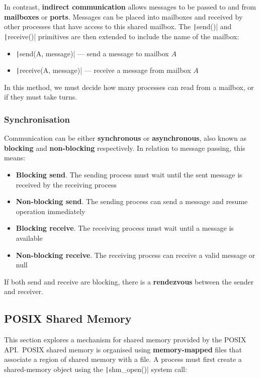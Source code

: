 \documentclass{article}
\begin{document}
In contrast, \textbf{indirect communication} allows messages to be
passed to and from \textbf{mailboxes} or \textbf{ports}. Messages can
be placed into mailboxes and received by other processes that have
access to this shared mailbox. The \texttt|send()| and
\texttt|receive()| primitives are then extended to include
the name of the mailbox:
\begin{itemize}
    \item \texttt|send(A, message)| --- send a message to
          mailbox \(A\)
    \item \texttt|receive(A, message)| --- receive a message
          from mailbox \(A\)
\end{itemize}
In this method, we must decide how many processes can read from a
mailbox, or if they must take turns.
\subsubsection{Synchronisation}
Communication can be either \textbf{synchronous} or
\textbf{asynchronous}, also known as \textbf{blocking} and
\textbf{non-blocking} respectively. In relation to message passing,
this means:
\begin{itemize}
    \item \textbf{Blocking send}. The sending process must wait until
          the sent message is received by the receiving process
    \item \textbf{Non-blocking send}. The sending process can send a
          message and resume operation immediately
    \item \textbf{Blocking receive}. The receiving process must wait
          until a message is available
    \item \textbf{Non-blocking receive}. The receiving process can
          receive a valid message or null
\end{itemize}
If both send and receive are blocking, there is a \textbf{rendezvous}
between the sender and receiver.
\subsection{POSIX Shared Memory}
This section explores a mechanism for shared memory provided by the
POSIX API.\ POSIX shared memory is organised using
\textbf{memory-mapped} files that associate a region of shared memory
with a file. A process must first create a shared-memory object using
the \texttt|shm_open()| system call:
\inputminted{c}{code/posix_shared_memory.c}
\end{document}
